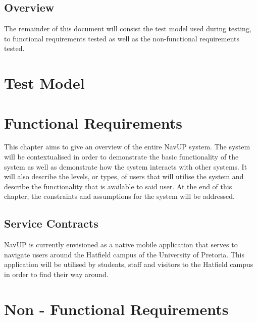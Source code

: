 \documentclass{article}
\begin{document}
		\subsection{Overview}\label{subsec:overview}
			The remainder of this document will consist the test model used during testing, to functional requirements tested as well as the non-functional requirements tested.\\


	\cleardoublepage

	\section{Test Model}\label{sec:overall-Test Model}
	\section{Functional Requirements}\label{sec:overall-functional}
		This chapter aims to give an overview of the entire NavUP system. The system will be contextualised in order to demonstrate the basic functionality of the system as well as demonstrate how the system interacts with other systems. It will also describe the levels, or types, of users that will utilise the system and describe the functionality that is available to said user. At the end of this chapter, the constraints and assumptions for the system will be addressed.

		\subsection{Service Contracts}\label{subsec:overall-contracts}
			NavUP is currently envisioned as a native mobile application that serves to navigate users around the Hatfield campus of the University of Pretoria. This application will be utilised by students, staff and visitors to the Hatfield campus in order to find their way around.\\
			
		\section{Non - Functional Requirements}\label{sec:overall-nonfunctional}
		
\end{document}
